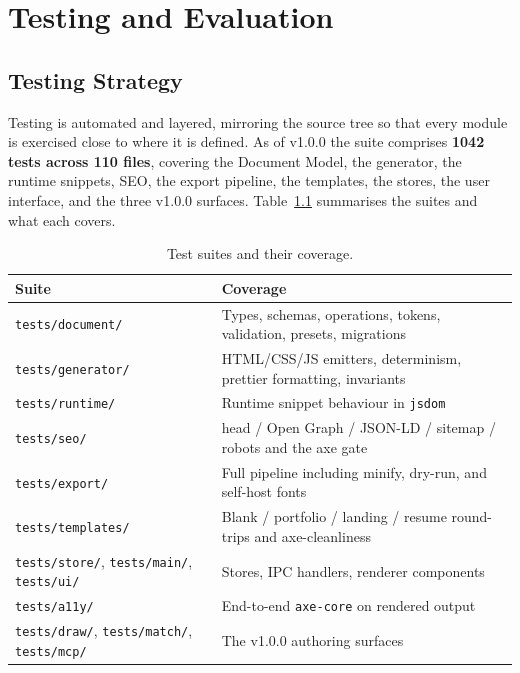 
\chapter{Testing and Evaluation}
\label{ch:testing}

\section{Testing Strategy}
Testing is automated and layered, mirroring the source tree so that every module is
exercised close to where it is defined. As of v1.0.0 the suite comprises
\textbf{1042 tests across 110 files}, covering the Document Model, the generator,
the runtime snippets, SEO, the export pipeline, the templates, the stores, the user
interface, and the three v1.0.0 surfaces. Table~\ref{tab:suites} summarises the
suites and what each covers.

\begin{table}[H]
  \centering
  \caption{Test suites and their coverage.}
  \label{tab:suites}
  \small
  \begin{tabularx}{\linewidth}{@{}l X@{}}
    \toprule
    \textbf{Suite} & \textbf{Coverage} \\
    \midrule
    \texttt{tests/document/}  & Types, schemas, operations, tokens, validation, presets, migrations \\
    \texttt{tests/generator/} & HTML/CSS/JS emitters, determinism, prettier formatting, invariants \\
    \texttt{tests/runtime/}   & Runtime snippet behaviour in \texttt{jsdom} \\
    \texttt{tests/seo/}       & head / Open Graph / JSON-LD / sitemap / robots and the axe gate \\
    \texttt{tests/export/}    & Full pipeline including minify, dry-run, and self-host fonts \\
    \texttt{tests/templates/} & Blank / portfolio / landing / resume round-trips and axe-cleanliness \\
    \texttt{tests/store/}, \texttt{tests/main/}, \texttt{tests/ui/} & Stores, IPC handlers, renderer components \\
    \texttt{tests/a11y/}      & End-to-end \texttt{axe-core} on rendered output \\
    \texttt{tests/draw/}, \texttt{tests/match/}, \texttt{tests/mcp/} & The v1.0.0 authoring surfaces \\
    \bottomrule
  \end{tabularx}
\end{table}

